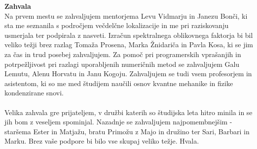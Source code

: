 
\cleardoublepage
\mbox{}
\vfill
{\Large \bf Zahvala}
\vspace{1cm}\\
Na prvem mestu se zahvaljujem mentorjema Levu Vidmarju in Janezu Bonči, ki sta me seznanila s področjem večdelčne lokalizacije in me pri raziskovanju usmerjala ter podpirala z nasveti. Izračun spektralnega oblikovnega faktorja bi bil veliko težji brez razlag Tomaža Prosena, Marka Žnidariča in Pavla Kosa, ki se jim za čas in trud posebej zahvaljujem. 
Za pomoč pri programerskih vprašanjih in potrpežljivost pri razlagi uporabljenih numeričnih metod se zahvaljujem Galu Lemutu, Alenu Horvatu in Janu Kogoju. Zahvaljujem se tudi vsem profesorjem in asistentom, ki so me med študijem naučili osnov kvantne mehanike in fizike kondenzirane snovi. \\\\
Velika zahvala gre prijateljem, v družbi katerih so študijska leta hitro minila in se jih bom z veseljem spominjal. Nazadnje se zahvaljujem najpomembnejšim - staršema Ester in Matjažu, bratu Primožu z Majo in družino ter Sari, Barbari in Marku. Brez vaše podpore bi bilo vse skupaj veliko težje. Hvala.   



